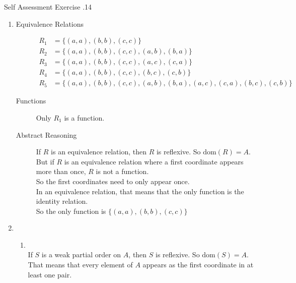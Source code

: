 \documentclass[../notes.tex]{subfiles}
\begin{document}
\begin{exercise}{Self Assessment Exercise \thechapter.14}
\begin{enumerate}
\begin{proof}
\begin{description}
								\end{description}
								As the domain of $R$ is not equal to the input set, $R$ is not a function.
							\end{proof}
						\pagebreak
						\item {}
							\begin{description}
								\item[Equivalence Relations]
									\begin{align*}
										R_{1} &= \bigl\{(a, a), (b, b), (c, c)\bigr\}\\
										R_{2} &= \bigl\{(a, a), (b, b), (c, c), (a, b), (b, a)\bigr\}\\
										R_{3} &= \bigl\{(a, a), (b, b), (c, c), (a, c), (c, a)\bigr\}\\
										R_{4} &= \bigl\{(a, a), (b, b), (c, c), (b, c), (c, b)\bigr\}\\
										R_{5} &= \bigl\{(a, a), (b, b), (c, c), (a, b), (b, a), (a, c), (c, a), (b, c), (c, b)\bigr\}
									\end{align*}
								\item[Functions] Only $R_{1}$ is a function.
								\item[Abstract Reasoning] If $R$ is an equivalence relation, then $R$ is reflexive. So $\mathrm{dom}(R) = A$.\\
									But if $R$ is an equivalence relation where a first coordinate appears more than once, $R$ is not a function.\\
									So the first coordinates need to only appear once.\\
									In an equivalence relation, that means that the only function is the identity relation.\\
									So the only function is $\bigl\{(a, a), (b, b), (c, c)\bigr\}$
							\end{description}
						\item {}
							\begin{enumerate}[label=(\alph*)]
								\item {}\\
									If $S$ is a weak partial order on $A$, then $S$ is reflexive. So $\mathrm{dom}(S) = A$.\\
									That means that every element of $A$ appears as the first coordinate in at least one pair.\\

\end{enumerate}
\end{enumerate}
\end{exercise}
\end{document}
